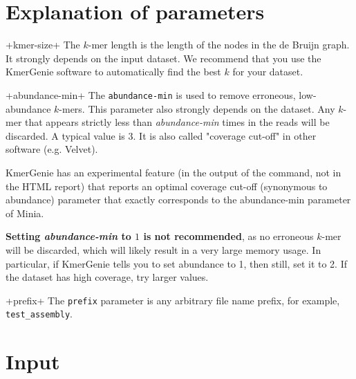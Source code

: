 \documentclass[a4paper]{article}
\begin{document}
\section{Explanation of parameters}
\begin{description}

\vitem+kmer-size+
The $k$-mer length is the length of the nodes in the de Bruijn graph. It strongly depends on the input dataset. We recommend that you use the KmerGenie software to automatically find the best $k$ for your dataset.

\vitem+abundance-min+
The \verb+abundance-min+ is used to remove erroneous, low-abundance $k$-mers. This parameter also strongly depends on the dataset. Any $k$-mer that appears strictly less than \emph{abundance-min} times in the reads will be discarded. A typical value is $3$. It is also called "coverage cut-off" in other software (e.g. Velvet).

KmerGenie has an experimental feature (in the output of the command, not in the HTML report) that reports an optimal coverage cut-off (synonymous to abundance) parameter that exactly corresponds to the abundance-min parameter of Minia.

\textbf{Setting \emph{abundance-min} to $1$ is not recommended}, as no erroneous $k$-mer will be discarded, which will likely result in a very large memory usage. In particular, if KmerGenie tells you to set abundance to 1, then still, set it to 2. If the dataset has high coverage, try larger values. 

\vitem+prefix+
The \verb+prefix+ parameter is any arbitrary file name prefix, for example, \verb+test_assembly+.

\end{description}

\section{Input}
\end{document}
